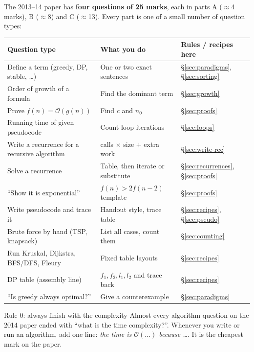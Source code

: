 \documentclass{fkt-notes}
\newcommand{\Oh}{\mathcal{O}}
\begin{document}
The 2013--14 paper has \textbf{four questions of 25 marks}, each in parts A ($\approx$4 marks), B ($\approx$8) and C ($\approx$13). Every part is one of a small number of question types:

\begin{center}
\small
\begin{tabular}{@{}p{4.3cm}p{5.4cm}p{4.6cm}@{}}
\toprule
Question type & What you do & Rules / recipes here \\
\midrule
Define a term (greedy, DP, stable, \dots) & One or two exact sentences & \S\ref{sec:paradigms}, \S\ref{sec:sorting} \\
Order of growth of a formula & Find the dominant term & \S\ref{sec:growth} \\
Prove $f(n)=\Oh(g(n))$ & Find $c$ and $n_0$ & \S\ref{sec:proofs} \\
Running time of given pseudocode & Count loop iterations & \S\ref{sec:loops} \\
Write a recurrence for a recursive algorithm & calls $\times$ size $+$ extra work & \S\ref{sec:write-rec} \\
Solve a recurrence & Table, then iterate or substitute & \S\ref{sec:recurrences}, \S\ref{sec:proofs} \\
``Show it is exponential'' & $f(n)>2f(n-2)$ template & \S\ref{sec:proofs} \\
Write pseudocode and trace it & Handout style, trace table & \S\ref{sec:recipes}, \S\ref{sec:pseudo} \\
Brute force by hand (TSP, knapsack) & List all cases, count them & \S\ref{sec:counting} \\
Run Kruskal, Dijkstra, BFS/DFS, Fleury & Fixed table layouts & \S\ref{sec:recipes} \\
DP table (assembly line) & $f_1,f_2,l_1,l_2$ and trace back & \S\ref{sec:recipes} \\
``Is greedy always optimal?'' & Give a counterexample & \S\ref{sec:paradigms} \\
\bottomrule
\end{tabular}
\end{center}

\begin{rulebox}{Rule 0: always finish with the complexity}
Almost every algorithm question on the 2014 paper ended with ``what is the time complexity?''. Whenever you write or run an algorithm, add one line: \emph{the time is $\Oh(\dots)$ because \dots}. It is the cheapest mark on the paper.
\end{rulebox}
\end{document}
